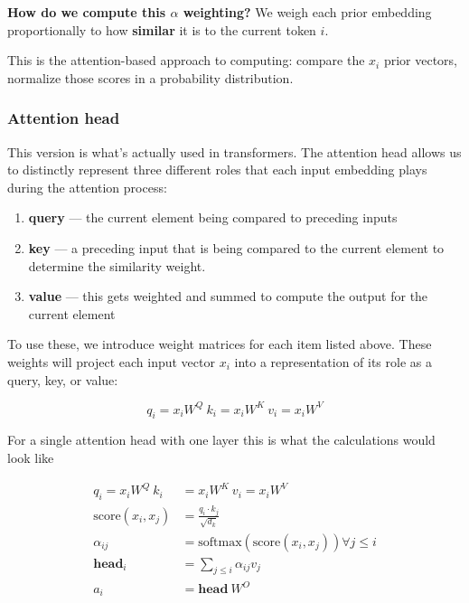 \documentclass[11pt]{article}
\begin{document}
\textbf{How do we compute this $\alpha$ weighting?} We weigh each prior embedding proportionally to how \textbf{similar } it is to the current token $i$.

This is the attention-based approach to computing: compare the $x_i$ prior vectors, normalize those scores in a probability distribution.

\subsubsection{Attention head}

This version is what's actually used in transformers. The attention head allows us to distinctly represent three different roles that each input embedding plays during the attention process:

\begin{enumerate}
	\item \textbf{query} --- the current element being compared to preceding inputs
	\item \textbf{key} --- a preceding input that is being compared to the current element to determine the similarity weight.
	\item \textbf{value} --- this gets weighted and summed to compute the output for the current element
\end{enumerate}

To use these, we introduce weight matrices for each item listed above. These weights will project each input vector $x_i$ into a representation of its role as a query, key, or value:

\begin{equation*}
	q_i = x_i W^Q \ k_i = x_i W^K \ v_i = x_i W^V
\end{equation*}

For a single attention head with one layer this is what the calculations would look like

\begin{align*}
	q_i = x_i W^Q \ k_i    & = x_i W^K \ v_i = x_i W^V                                \\
	\text{score}(x_i, x_j) & = \frac{q_i \cdot k_j}{\sqrt{d_k}}                       \\
	\alpha_{ij}            & = \text{softmax}(\text{score}(x_i, x_j)) \forall j \le i \\
	\mathbf{head}_i        & = \sum_{j \le i} \alpha_{ij} v_j                         \\
	a_i                    & = \mathbf{head} \  W^O
\end{align*}
\end{document}
